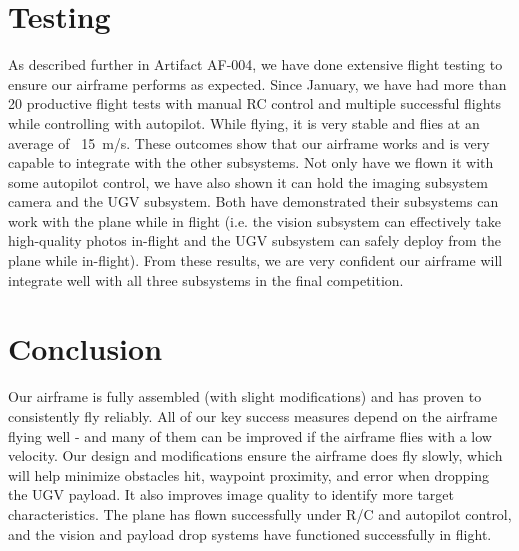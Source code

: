 \documentclass[]{auvsi_doc}
\begin{document}
\section{Testing}
As described further in Artifact AF-004, we have done extensive flight testing to ensure our airframe performs as expected. Since January, we have had more than 20 productive flight tests with manual RC control and multiple successful flights while controlling with autopilot. While flying, it is very stable and flies at an average of ~15\ m/s. These outcomes show that our airframe works and is very capable to integrate with the other subsystems. Not only have we flown it with some autopilot control, we have also shown it can hold the imaging subsystem camera and the UGV subsystem. Both have demonstrated their subsystems can work with the plane while in flight (i.e. the vision subsystem can effectively take high-quality photos in-flight and the UGV subsystem can safely deploy from the plane while in-flight). From these results, we are very confident our airframe will integrate well with all three subsystems in the final competition.

\section{Conclusion}
Our airframe is fully assembled (with slight modifications) and has proven to consistently fly reliably. All of our key success measures depend on the airframe flying well - and many of them can be improved if the airframe flies with a low velocity. Our design and modifications ensure the airframe does fly slowly, which will help minimize obstacles hit, waypoint proximity, and error when dropping the UGV payload. It also improves image quality to identify more target characteristics. The plane has flown successfully under R/C and autopilot control, and the vision and payload drop systems have functioned successfully in flight.
\end{document}
